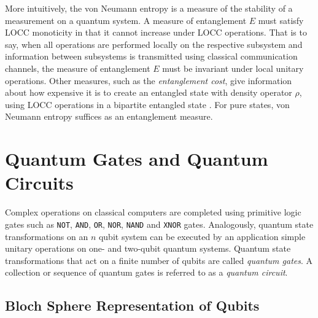 More intuitively, the von Neumann entropy is a measure of the stability of a measurement on a quantum system. A measure of entanglement $E$ must satisfy LOCC monoticity in that it cannot increase under LOCC operations. That is to say, when all operations are performed locally on the respective subsystem and information between subsystems is transmitted using classical communication channels, the measure of entanglement $E$ must be invariant under local unitary operations. Other measures, such as the \textit{entanglement cost}, give information about how expensive it is to create an entangled state with density operator $\rho$, using LOCC operations in a bipartite entangled state \cite{Kurzyk2012}. For pure states, von Neumann entropy suffices as an entanglement measure.

\section{Quantum Gates and Quantum Circuits \label{sec:q-gates+q-circuits}}

Complex operations on classical computers are completed using primitive logic gates such as \texttt{NOT}, \texttt{AND}, \texttt{OR}, \texttt{NOR}, \texttt{NAND} and \texttt{XNOR} gates. Analogously, quantum state transformations on an $n$ qubit system can be executed by an application simple unitary operations on one- and two-qubit quantum systems. Quantum state transformations that act on a finite number of qubits are called \textit{quantum gates}. A collection or sequence of quantum gates is referred to as a \textit{quantum circuit}. 

\subsection{Bloch Sphere Representation of Qubits \label{subsec:bloch-sphere}}

